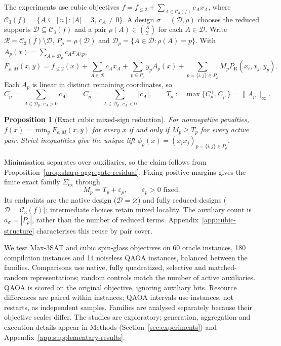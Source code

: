 \documentclass[a4paper,onecolumn,11pt,unpublished]{quantumarticle}
\newtheorem{proposition}[proposition]{Proposition}
\theoremstyle{remark}
\begin{document}
The experiments use cubic objectives
$f=f_{\leq2}+\sum_{A\in\mathcal C_3(f)}c_Ax_A$, where
$\mathcal C_3(f)=\{A\subseteq[n]:|A|=3,\ c_A\neq0\}$.
A design $\sigma=(\mathcal D,\rho)$ chooses the reduced supports
$\mathcal D\subseteq\mathcal C_3(f)$ and a pair
$\rho(A)\in\binom A2$ for each $A\in\mathcal D$.
Write $\mathcal R=\mathcal C_3(f)\setminus\mathcal D$,
$P_\rho=\rho(\mathcal D)$ and
$\mathcal D_p=\{A\in\mathcal D:\rho(A)=p\}$.
With $A_p(x)=\sum_{A\in\mathcal D_p}c_Ax_{A\setminus p}$,
\begin{equation}
F_{\rho,M}(x,y)=f_{\leq2}(x)+\sum_{A\in\mathcal R}c_Ax_A
+\sum_{p\in P_\rho}y_pA_p(x)
+\sum_{p=\{i,j\}\in P_\rho}M_pP_{\mathrm R}(x_i,x_j,y_p).
\label{eq:cubic-mixed-objective}
\end{equation}
Each $A_p$ is linear in distinct remaining coordinates, so
\begin{equation}
C_p^+=\sum_{A\in\mathcal D_p,\,c_A>0}c_A,\qquad
C_p^-=\sum_{A\in\mathcal D_p,\,c_A<0}|c_A|,\qquad
T_p:=\max\{C_p^+,C_p^-\}=\|A_p\|_\infty.
\label{eq:cubic-threshold}
\end{equation}

\begin{proposition}[Exact cubic mixed-sign reduction]
\label{prop:cubic-mixed-sign}
For nonnegative penalties, $f(x)=\min_yF_{\rho,M}(x,y)$ for every $x$
if and only if $M_p\geq T_p$ for every active pair. Strict inequalities give
the unique lift $\phi_\rho(x)=(x_ix_j)_{p=\{i,j\}\in P_\rho}$.
\end{proposition}

Minimisation separates over auxiliaries, so the claim follows from
Proposition~\ref{prop:sharp-aggregate-residual}. Fixing positive margins gives
the finite exact family $\Sigma_{\mathrm{ex}}^\varepsilon$ through
\begin{equation}
M_p=T_p+\varepsilon_p,\qquad \varepsilon_p>0\text{ fixed}.
\label{eq:canonical-cubic-penalty}
\end{equation}
Its endpoints are the native design ($\mathcal D=\varnothing$) and fully
reduced designs ($\mathcal D=\mathcal C_3(f)$); intermediate choices retain
mixed locality. The auxiliary count is $a_\sigma=|P_\rho|$, rather than
the number of reduced terms. Appendix~\ref{app:cubic-structure} characterises
this reuse by pair cover.




We test Max-3SAT and cubic spin-glass objectives on 60 oracle instances,
180 compilation instances and 14 noiseless QAOA instances, balanced between
the families. Comparisons use native, fully quadratized, selective and
matched-random representations; random controls match the number of active
auxiliaries. QAOA is scored on the original objective, ignoring auxiliary
bits. Resource differences are paired within instances; QAOA intervals use
instances, not restarts, as independent samples. Families are analysed
separately because their objective scales differ. The studies are exploratory;
generation, aggregation and execution details appear in
Methods (Section~\ref{sec:experiments}) and
Appendix~\ref{app:supplementary-results}.
\end{document}
